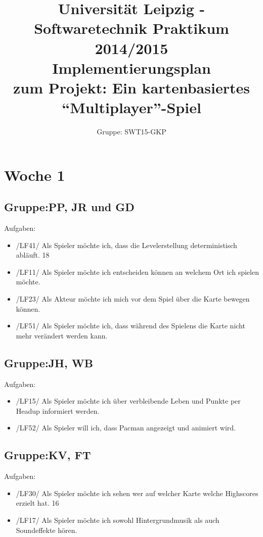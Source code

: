 \documentclass[11pt,a4paper]{article}
\author{Gruppe: SWT15-GKP}
\title{Universität Leipzig - Softwaretechnik Praktikum 2014/2015 \\  Implementierungsplan \\ zum Projekt: Ein kartenbasiertes “Multiplayer”-Spiel}
\begin{document}
\maketitle

\clearpage

\flushleft


\section*{Woche 1}
\subsection*{Gruppe:PP, JR und GD} \par\bigskip
Aufgaben:
\begin{itemize}
\item /LF41/ Als Spieler möchte ich, dass die Levelerstellung deterministisch abläuft. 18
\item /LF11/ Als Spieler möchte ich entscheiden können an welchem Ort ich spielen möchte.
\item /LF23/ Als Akteur möchte ich mich vor dem Spiel über die Karte bewegen können.
\item /LF51/ Als Spieler möchte ich, dass während des Spielens die Karte nicht mehr verändert werden kann. 
\end{itemize}


\subsection*{Gruppe:JH, WB} \par\bigskip
Aufgaben:
\begin{itemize}
\item /LF15/ Als Spieler möchte ich über verbleibende Leben und Punkte per Headup informiert werden.
\item /LF52/ Als Spieler will ich, dass Pacman angezeigt und animiert wird.
\end{itemize}

\subsection*{Gruppe:KV, FT} \par\bigskip
Aufgaben:
\begin{itemize}
\item /LF30/ Als Spieler möchte ich sehen wer auf welcher Karte welche Highscores
erzielt hat. 16
\item /LF17/ Als Spieler möchte ich sowohl Hintergrundmusik als auch Soundeffekte hören.
\end{itemize}
\end{document}
